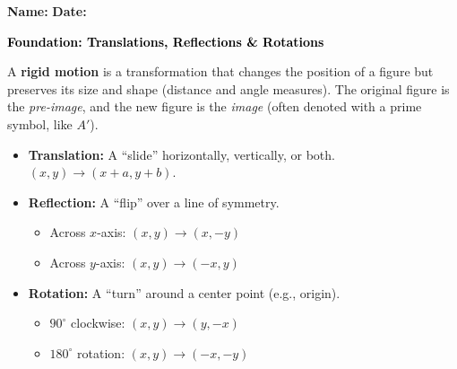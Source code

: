 \documentclass[12pt, letterpaper, fleqn]{article}
\begin{document}
\textbf{Name:} \underline{\hspace{5cm}}
\hfill
\textbf{Date:} \underline{\hspace{3cm}}\\

\begin{tcolorbox}[colback=customteal!20]
    \large\textcolor{black}{\textbf{Foundation: Translations, Reflections \& Rotations}}
\end{tcolorbox}

\vspace{3mm}

\noindent
A \textbf{rigid motion} is a transformation that changes the position of a figure but preserves its size and shape (distance and angle measures). The original figure is the \textit{pre-image}, and the new figure is the \textit{image} (often denoted with a prime symbol, like $A'$).

\begin{itemize}
    \item \textbf{Translation:} A ``slide'' horizontally, vertically, or both. $(x, y) \rightarrow (x+a, y+b)$.
    \item \textbf{Reflection:} A ``flip'' over a line of symmetry. 
    \begin{itemize}
        \item Across $x$-axis: $(x, y) \rightarrow (x, -y)$
        \item Across $y$-axis: $(x, y) \rightarrow (-x, y)$
    \end{itemize}
    \item \textbf{Rotation:} A ``turn'' around a center point (e.g., origin).
    \begin{itemize}
        \item $90^\circ$ clockwise: $(x, y) \rightarrow (y, -x)$
        \item $180^\circ$ rotation: $(x, y) \rightarrow (-x, -y)$
    \end{itemize}
\end{itemize}

\vspace{4mm}
\end{document}
